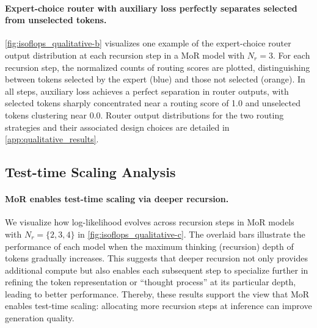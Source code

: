 \paragraph{Expert-choice router with auxiliary loss perfectly separates selected from unselected tokens.}

\autoref{fig:isoflops_qualitative-b} visualizes one example of the expert-choice router output distribution at each recursion step in a MoR model with $N_r = 3$. For each recursion step, the normalized counts of routing scores are plotted, distinguishing between tokens selected by the expert (blue) and those not selected (orange). In all steps, auxiliary loss achieves a perfect separation in router outputs, with selected tokens sharply concentrated near a routing score of 1.0 and unselected tokens clustering near 0.0. Router output distributions for the two routing strategies and their associated design choices are detailed in \autoref{app:qualitative_results}.




\subsection{Test-time Scaling Analysis}
\paragraph{MoR enables test-time scaling via deeper recursion.}

We visualize how log-likelihood evolves across recursion steps in MoR models with $N_r = \{2,3,4\}$ in \autoref{fig:isoflops_qualitative-c}. The overlaid bars illustrate the performance of each model when the maximum thinking (recursion) depth of tokens gradually increases. This suggests that deeper recursion not only provides additional compute but also enables each subsequent step to specialize further in refining the token representation or ``thought process'' at its particular depth, leading to better performance. Thereby, these results support the view that MoR enables test-time scaling: allocating more recursion steps at inference can improve generation quality.

